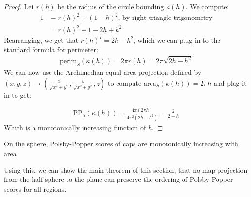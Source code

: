\begin{proof}
  Let $r(h)$ be the radius of the circle bounding $\kappa(h)$. We
  compute: 
  \begin{align*}
    1 &= r(h)^2 + (1-h)^2 \text {, by right triangle trigonometry}\\ 
      &= r(h)^2 + 1 - 2h+h^2
  \end{align*}
  Rearranging, we get that $r(h)^2= 2h-h^2$, which we can plug in to
  the standard formula for perimeter:
  \begin{align*}
    \mathrm{perim}_S(\kappa(h)) = 2\pi r(h) = 2\pi \sqrt{2h-h^2}
  \end{align*}
  We can now use the Archimedian equal-area projection 
  defined by $(x,y,z) \to
  \left(\frac{x}{\sqrt{x^2+y^2}},\frac{y}{\sqrt{x^2+y^2}}, z\right)$ 
  to compute $\mathrm{area}_S(\kappa(h)) = 2\pi h$ and plug it in to 
  get:

  \begin{align*}
    \mathrm{PP}_S(\kappa(h)) = \frac{4\pi (2\pi h) }{4 \pi^2 (2h-h^2)}
    = \frac{2}{2-h}
  \end{align*}
  Which is a monotonically increasing function of $h$.
\end{proof}
\begin{corollary}\label{cor:capscale}
  On the sphere, Polsby-Popper scores of caps are monotonically
  increasing with area
\end{corollary}
Using this, we can show the main theorem of this section, that no map
projection from the half-sphere to the plane can preserve the ordering
of Polsby-Popper scores for all regions.  

